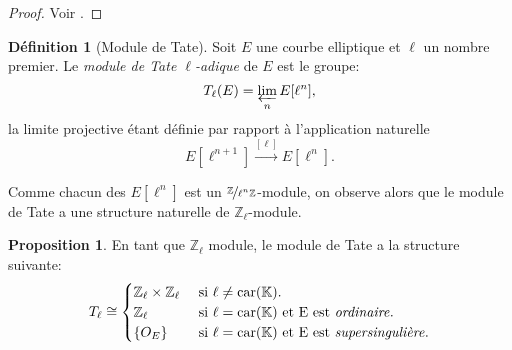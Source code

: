 \documentclass[10pt,a4paper]{book}
\theoremstyle{plain}
\theoremstyle{definition}
\theoremstyle{definition}
\theoremstyle{definition}
\newtheorem{prop}[thm]{Proposition}
\theoremstyle{definition}
\newtheorem{defi}[thm]{Définition}
\theoremstyle{remark}
\theoremstyle{remark}
\theoremstyle{definition}
\begin{document}
\begin{proof}
Voir \cite[Corrolary III.6.4]{Silv1}.
\end{proof}


\begin{defi}[Module de Tate]
Soit $E$ une courbe elliptique et $\ell$ un nombre premier. Le \emph{module de Tate $\ell$-adique} de $E$ est le groupe:
\begin{equation*}
T_{\ell}(E)=\varprojlim_nE[\ell^n],
\end{equation*}
la limite projective étant définie par rapport à l'application naturelle
\begin{equation*}
E[\ell^{n+1}] \overset{[\ell]}{\rightarrow} E[\ell^n].
\end{equation*}
\end{defi}
Comme chacun des $E[\ell^n]$ est un $\nicefrac{\mathbb{Z}}{\ell^n\mathbb{Z}}$-module, on observe alors que le module de Tate a une structure naturelle de $\mathbb{Z}_{\ell}$-module.
\begin{prop}
En tant que $\mathbb{Z}_{\ell}$ module, le module de Tate a la structure suivante:
\begin{equation*}
T_{\ell} \cong 
\begin{cases} 
\mathbb{Z}_{\ell} \times \mathbb{Z}_{\ell} &\text{ si } \ell \neq \mathrm{car}(\mathbb{K}). \\
\mathbb{Z}_{\ell} &\text{ si } \ell=\mathrm{car}(\mathbb{K})  \text{ et E est \emph{ordinaire}}. \\
\{O_E\} &\text{ si } \ell=\mathrm{car}(\mathbb{K})  \text{ et E est \emph{supersingulière}}.
\end{cases}
\end{equation*}
\end{prop}

\end{document}

